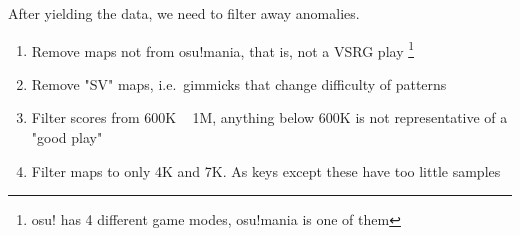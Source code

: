 After yielding the data, we need to filter away anomalies.

\begin{enumerate}
    \item Remove maps not from osu!mania, that is, not a VSRG play
    \footnote{osu! has 4 different game modes, osu!mania is one of them}
    \item Remove "SV" maps, i.e.\ gimmicks that change difficulty of patterns
    \item Filter scores from 600K ~ 1M, anything below 600K is not representative of a "good play"
    \item Filter maps to only 4K and 7K. As keys except these have too little samples
\end{enumerate}


